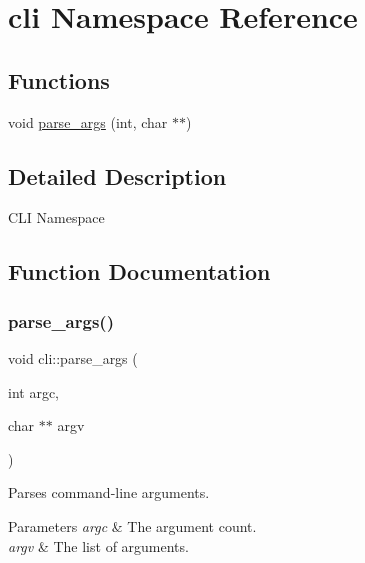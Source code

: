 \hypertarget{namespacecli}{}\section{cli Namespace Reference}
\label{namespacecli}
\subsection*{Functions}
\begin{DoxyCompactItemize}
\item 
void \mbox{\hyperlink{namespacecli_ac2de3c7922d45ecc2f444cae2013b1d7}{parse\+\_\+args}} (int, char $\ast$$\ast$)
\end{DoxyCompactItemize}


\subsection{Detailed Description}
C\+LI Namespace 

\subsection{Function Documentation}
\mbox{\label{namespacecli_ac2de3c7922d45ecc2f444cae2013b1d7}} 
\subsubsection{\texorpdfstring{parse\+\_\+args()}{parse\_args()}}
{\footnotesize\ttfamily void cli\+::parse\+\_\+args (\begin{DoxyParamCaption}\item[{int}]{argc,  }\item[{char $\ast$$\ast$}]{argv }\end{DoxyParamCaption})}

Parses command-\/line arguments.


\begin{DoxyParams}{Parameters}
{\em argc} & The argument count. \\
\hline
{\em argv} & The list of arguments. \\
\hline
\end{DoxyParams}
